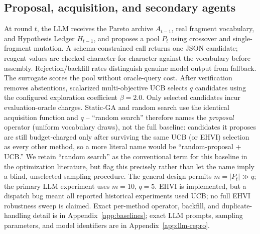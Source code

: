 \documentclass{article}
\begin{document}
\subsection{Proposal, acquisition, and secondary agents}
At round $t$, the LLM receives the Pareto archive $A_{t-1}$, real fragment vocabulary, and Hypothesis Ledger $H_{t-1}$, and proposes a pool $P_t$ using crossover and single-fragment mutation. A schema-constrained call returns one JSON candidate; reagent values are checked character-for-character against the vocabulary before assembly. Rejection/backfill rates distinguish genuine model output from fallback. The surrogate scores the pool without oracle-query cost. After verification removes abstentions, scalarized multi-objective UCB selects $q$ candidates using the configured exploration coefficient $\beta=2.0$. Only selected candidates incur evaluation-oracle charges. Static-GA and random search use the identical acquisition function and $q$ -- ``random search'' therefore names the \emph{proposal} operator (uniform vocabulary draws), not the full baseline: candidates it proposes are still budget-charged only after surviving the same UCB (or EHVI) selection as every other method, so a more literal name would be ``random-proposal + UCB.'' We retain ``random search'' as the conventional term for this baseline in the optimization literature, but flag this precisely rather than let the name imply a blind, unselected sampling procedure. The general design permits $m=|P_t|\gg q$; the primary LLM experiment uses $m=10$, $q=5$. EHVI is implemented, but a dispatch bug meant all reported historical experiments used UCB; no full EHVI robustness sweep is claimed. Exact per-method operator, backfill, and duplicate-handling detail is in Appendix~\ref{app:baselines}; exact LLM prompts, sampling parameters, and model identifiers are in Appendix~\ref{app:llm-repro}.
\end{document}
